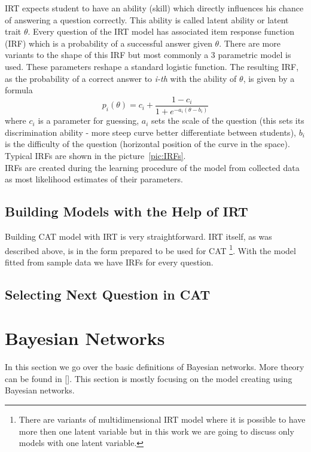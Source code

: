 IRT expects student to have an ability (skill) which directly influences his chance of answering a question correctly. This ability is called latent ability or latent trait $\theta$. Every question of the IRT model has associated item response function (IRF) which is a probability of a successful answer given $\theta$. There are more variants to the shape of this IRF but most commonly a 3 parametric model is used. These parameters reshape a standard logistic function. The resulting IRF, as the probability of a correct answer to \textit{i-th} with the ability of $\theta$, is given by a formula
\begin{equation}
p_i(\theta) = c_i + \frac{1-c_i}{1+e^{-a_i(\theta-b_i)}}
\label{eq:IRF}
\end{equation}
where $c_i$ is a parameter for guessing, $a_i$ sets the scale of the question (this sets its discrimination ability - more steep curve better differentiate between students), $b_i$ is the difficulty of the question (horizontal position of the curve in the space). Typical IRFs are shown in the picture~\ref{pic:IRFs}.\\
IRFs are created during the learning procedure of the model from collected data as most likelihood estimates of their parameters.

\subsection{Building Models with the Help of IRT}
Building CAT model with IRT is very straightforward. IRT itself, as was described above, is in the form prepared to be used for CAT \footnote{There are variants of multidimensional IRT model where it is possible to have more then one latent variable but in this work we are going to discuss only models with one latent variable.}. With the model fitted from sample data we have IRFs for every question. 

\subsection{Selecting Next Question in CAT}

\section{Bayesian Networks}
In this section we go over the basic definitions of Bayesian networks. More theory can be found in []. This section is mostly focusing on the model creating using Bayesian networks.

